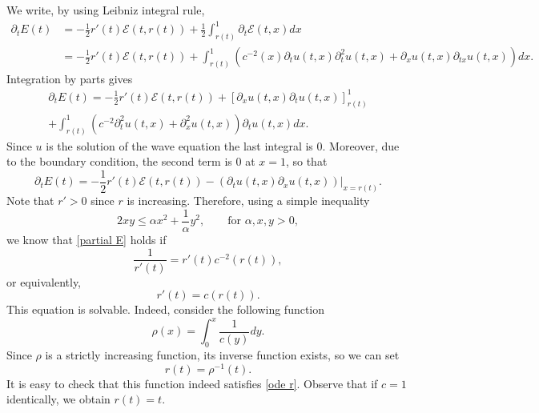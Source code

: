 \documentclass[12pt,oneside,final]{amsart}
\begin{document}
We write, by using Leibniz integral rule,
\begin{align*}
	\partial_t E(t) &= - \frac{1}{2} r'(t) \mathcal{E}(t, r(t)) + \frac{1}{2} \int_{r(t)}^{1} \partial_t \mathcal{E} (t,x)dx \\
	& = - \frac{1}{2} r'(t) \mathcal{E}(t, r(t)) + \int_{r(t)}^{1}\left(  c^{-2} (x) \partial_t u(t,x) \partial_t^2 u(t,x) + \partial_x u(t,x) \partial_{tx} u(t,x)\right) dx.
\end{align*}
Integration by parts gives
\begin{multline*}
	\partial_t E(t) = - \frac{1}{2} r'(t) \mathcal{E}(t, r(t)) + \left[\partial_x u(t,x)\partial_t u(t,x)\right]^{1}_{r(t)}\\
	+ \int_{r(t)}^{1} \left(c^{-2} \partial_t^2u(t,x) + \partial_x^2u(t,x)\right) \partial_t u(t,x) dx.
\end{multline*}
Since $u$ is the solution of the wave equation the last integral is $0$. 
Moreover, due to the boundary condition, the second term is $0$ at $x=1$, so that
\begin{equation*}
	\partial_t E(t) = -\frac{1}{2} r'(t) \mathcal{E}(t,r(t)) - \left.\left(\partial_tu(t,x)\partial_x u(t,x)\right)\right|_{x = r(t)}.
\end{equation*}
Note that $r'>0$ since $r$ is increasing. Therefore, using a simple inequality 
\begin{equation*}
	2 xy \leq \alpha x^2 + \frac{1}{\alpha} y^2 , \qquad \text{for } \alpha, x, y>0,
\end{equation*}
we know that \eqref{partial E} holds if
\begin{equation*}
	\frac{1}{r'(t)} = r'(t) c^{-2}(r(t)),
\end{equation*}
or equivalently, 
\begin{equation}\label{ode r}
	r'(t) = c(r(t)).
\end{equation}
This equation is solvable. Indeed, consider the following function
\begin{equation*}
	\rho(x)  = \int_0^x \frac{1}{c(y)} dy.
\end{equation*}
Since $\rho$ is a strictly increasing function, its inverse function exists, so we can set
\begin{equation*}
	r(t) = \rho^{-1} (t).
\end{equation*}
It is easy to check that this function indeed satisfies \eqref{ode r}. Observe that if $c=1$ identically, we obtain $r(t) = t$.
\end{document}
